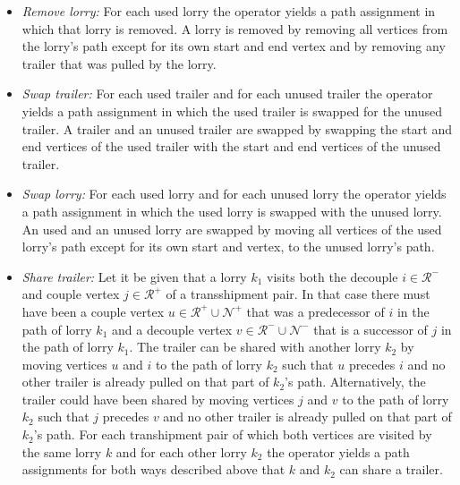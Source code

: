 \begin{itemize}
	\item \textit{Remove lorry:} For each used lorry the operator yields a path assignment in which that lorry is removed. A lorry is removed by removing all vertices from the lorry's path except for its own start and end vertex and by removing any trailer that was pulled by the lorry.

	\item \textit{Swap trailer:} For each used trailer and for each unused trailer the operator yields a path assignment in which the used trailer is swapped for the unused trailer. A trailer and an unused trailer are swapped by swapping the start and end vertices of the used trailer with the start and end vertices of the unused trailer.
	\item \textit{Swap lorry:} For each used lorry and for each unused lorry the operator  yields a path assignment in which the used lorry is swapped with the unused lorry. An used and an unused lorry are swapped by moving all vertices of the used lorry's path except for its own start and vertex, to the unused lorry's path.
	\item \textit{Share trailer:}
  Let it be given that a lorry $k_1$ visits both the decouple
  $i \in \mathcal R^- $
  and couple vertex
  $j \in \mathcal R^+ $
  of a transshipment pair.
  In that case there must have been a couple vertex
  $ u \in \mathcal R^+ \cup \mathcal N^+$
  that was a predecessor of $i$ in the path of lorry $k_1$ and a decouple vertex
  $ v \in \mathcal R^- \cup \mathcal N^-$
  that is a successor of $j$ in the path of lorry $k_1$.
  The trailer can be shared with another lorry $k_2$ by moving vertices $u$ and $i$ to the path of lorry $k_2$ such that $u$ precedes $i$ and no other trailer is already pulled on that part of $k_2$'s path.  Alternatively, the trailer could have been shared by moving vertices $j$ and $v$ to the path of lorry $k_2$ such that $j$ precedes $v$ and no other trailer is already pulled on that part of $k_2$'s path.
For each transhipment pair of which both vertices are visited by the same lorry $k$ and for each other lorry $k_2$  the operator yields a path assignments for both ways described above that $k$ and $k_2$ can share a trailer.


\end{itemize}

